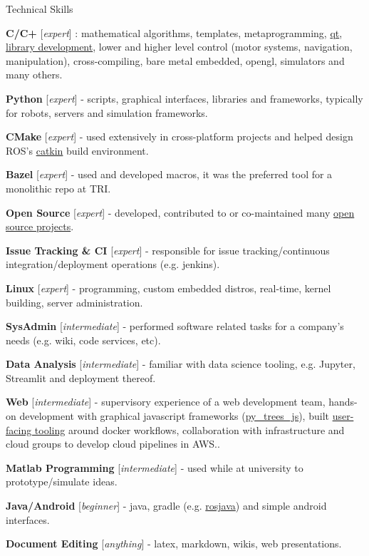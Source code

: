 \documentclass[a4paper,10pt]{article}
\begin{document}
\begin{cvsection}{Technical Skills}
 \raggedright
  \begin{djs_itemize}
    \item \textbf{C/C+} [\textit{expert}] : mathematical algorithms, templates, metaprogramming, \href{https://github.com/Itseez/opencv/pull/3194}{qt}, \href{https://github.com/stonier/ecl_core}{library development}, lower and higher level control (motor systems, navigation, manipulation), cross-compiling, bare metal embedded, opengl, simulators and many others.
    \item \textbf{Python} [\textit{expert}] - scripts, graphical interfaces, libraries and frameworks, typically for robots, servers and simulation frameworks.
    \item \textbf{CMake} [\textit{expert}] - used extensively in cross-platform projects and helped design ROS's \href{https://github.com/ros/catkin}{catkin} build environment.
    \item \textbf{Bazel} [\textit{expert}] - used and developed macros, it was the preferred tool for a monolithic repo at TRI.
    \item \textbf{Open Source} [\textit{expert}] - developed, contributed to or co-maintained many \href{https://github.com/stonier}{open source projects}.
    \item \textbf{Issue Tracking \& CI} [\textit{expert}] - responsible for issue tracking/continuous integration/deployment operations (e.g. jenkins).
    \item \textbf{Linux} [\textit{expert}] - programming, custom embedded distros, real-time, kernel building, server administration.
    \item \textbf{SysAdmin} [\textit{intermediate}] - performed software related tasks for a company's needs (e.g. wiki, code services, etc).
    \item \textbf{Data Analysis} [\textit{intermediate}] - familiar with data science tooling, e.g. Jupyter, Streamlit and deployment thereof.
    \item \textbf{Web} [\textit{intermediate}] - supervisory experience of a web development team, hands-on development with graphical javascript frameworks (\href{https://github.com/splintered-reality/py_trees_js}{py\_trees\_js}), built \href{https://github.com/stonier/groot_rocker}{user-facing tooling} around docker workflows, collaboration with infrastructure and cloud groups to develop cloud pipelines in AWS..
    \item \textbf{Matlab Programming} [\textit{intermediate}] - used while at university to prototype/simulate ideas.
    \item \textbf{Java/Android} [\textit{beginner}] - java, gradle (e.g. \href{https://github.com/rosjava}{rosjava}) and simple android interfaces.
    \item \textbf{Document Editing} [\textit{anything}] - latex, markdown, wikis, web presentations.
  \end{djs_itemize}
\end{cvsection}
\end{document}
